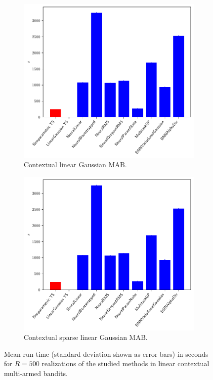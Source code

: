 \begin{figure}[!h]
	\centering
	\begin{subfigure}[c]{0.45\textwidth}
		\includegraphics[width=\textwidth]{./figs/linear_showdown/exec_time_barplot}
		\vspace*{-5ex}
		\caption{Contextual linear Gaussian MAB.}
		\label{afig:linear_showdown_exec_times}
	\end{subfigure}
	\begin{subfigure}[c]{0.45\textwidth}
		\includegraphics[width=\textwidth]{./figs/sparse_linear_showdown/exec_time_barplot}
		\vspace*{-5ex}
		\caption{Contextual sparse linear Gaussian MAB.}
		\label{afig:sparse_linear_showdown_exec_times}
	\end{subfigure}
	\vspace*{-2ex}
	\caption{Mean run-time (standard deviation shown as error bars) in seconds for $R=500$ realizations  of the studied methods in linear contextual multi-armed bandits.}
	\label{afig:contextual_bandit_showdown_exec_times}
\end{figure}

